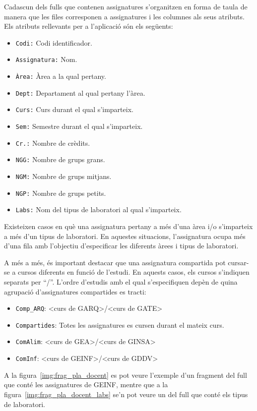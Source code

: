 \documentclass[a4paper,12pt]{ThesisStyle}
\begin{document}
Cadascun dels fulls que contenen assignatures s'organitzen en forma de taula de manera que les files corresponen a assignatures i les columnes als seus atributs. Els atributs rellevants per a l'aplicació són els següents:
\begin{itemize}
  \item \texttt{Codi:} Codi identificador.
  \item \texttt{Assignatura:} Nom.
  \item \texttt{Àrea:} Àrea a la qual pertany.
  \item \texttt{Dept:} Departament al qual pertany l'àrea.
  \item \texttt{Curs:} Curs durant el qual s'imparteix.
  \item \texttt{Sem:} Semestre durant el qual s'imparteix.
  \item \texttt{Cr.:} Nombre de crèdits.
  \item \texttt{NGG:} Nombre de grups grans.
  \item \texttt{NGM:} Nombre de grups mitjans.
  \item \texttt{NGP:} Nombre de grups petits.
  \item \texttt{Labs:} Nom del tipus de laboratori al qual s'imparteix.
\end{itemize}

Existeixen casos en què una assignatura pertany a més d'una àrea i/o s'imparteix a més d'un tipus de laboratori. En aquestes situacions, l'assignatura ocupa més d'una fila amb l'objectiu d'especificar les diferents àrees i tipus de laboratori.

A més a més, és important destacar que una assignatura compartida pot cursar-se a cursos diferents en funció de l'estudi. En aquests casos, els cursos s'indiquen separats per ``/''. L'ordre d'estudis amb el qual s'especifiquen depèn de quina agrupació d'assignatures compartides es tracti:
\begin{itemize}
  \item \texttt{Comp\_ARQ}: <curs de GARQ>/<curs de GATE>
  \item \texttt{Compartides}: Totes les assignatures es cursen durant el mateix curs.
  \item \texttt{ComAlim}: <curs de GEA>/<curs de GINSA>
  \item \texttt{ComInf}: <curs de GEINF>/<curs de GDDV>
\end{itemize}

A la figura~\ref{img:frag_pla_docent} es pot veure l'exemple d'un fragment del full que conté les assignatures de GEINF, mentre que a la figura~\ref{img:frag_pla_docent_labs} se'n pot veure un del full que conté els tipus de laboratori.
\end{document}

